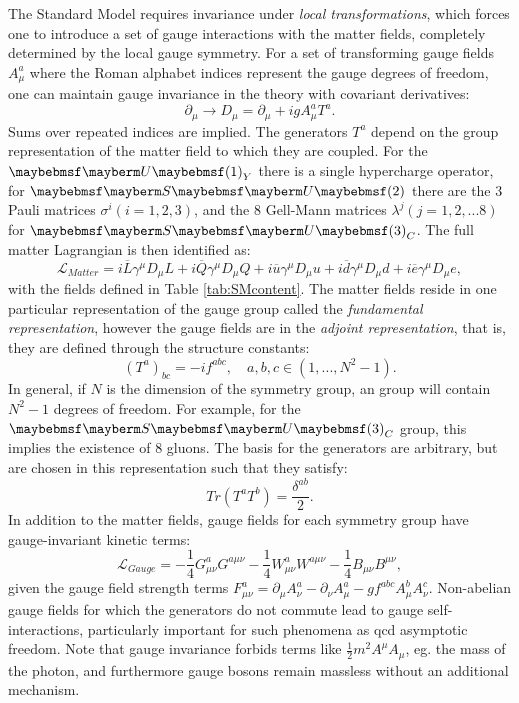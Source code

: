 The Standard Model requires invariance under \textit{local transformations}, which forces one to introduce a set of gauge interactions with the matter fields, completely determined by the local gauge symmetry.
For a set of transforming gauge fields $A^a_{\mu}$ where the Roman alphabet indices represent the gauge degrees of freedom, one can maintain gauge invariance in the theory with covariant derivatives:
\begin{equation}
\partial_{\mu}\rightarrow D_{\mu}=\partial_{\mu}+igA^{a}_{\mu}T^{a}.
\end{equation}
Sums over repeated indices are implied. The generators $T^a$ depend on the group representation of the matter field to which they are coupled. For the $\Ugroup{1}_{Y}$ there is a single hypercharge operator, for $\SUgroup{2}$ there are the 3 Pauli matrices $\sigma^{i} (i=1,2,3)$, and the 8 Gell-Mann matrices $\lambda^{j} (j=1,2,...8)$ for $\SUgroup{3}_{C}$. The full matter Lagrangian is then identified as:
\begin{equation}
\mathcal{L}_{Matter}=i\overline{L}\gamma^{\mu}D_{\mu}L+i\overline{Q}\gamma^{\mu}D_{\mu}Q+i\overline{u}\gamma^{\mu}D_{\mu}u+i\overline{d}\gamma^{\mu}D_{\mu}d+i\overline{e}\gamma^{\mu}D_{\mu}e,
\end{equation}
with the fields defined in Table \ref{tab:SMcontent}. The matter fields reside in one particular representation of the gauge group called the \textit{fundamental representation}, however the gauge fields are in the \textit{adjoint representation}, that is, they are defined through the structure constants:
\begin{equation}
(T^a)_{bc}=-if^{abc},\quad a,b,c \in (1,...,N^2-1).
\end{equation}
In general, if $N$ is the dimension of the symmetry group, an  group will contain $N^2-1$ degrees of freedom. For example, for the $\SUgroup{3}_{C}$ group, this implies the existence of 8 gluons. The basis for the generators are arbitrary, but are chosen in this representation such that they satisfy:
\begin{equation}
Tr(T^{a}T^{b})=\frac{\delta^{ab}}{2}.
\end{equation}
In addition to the matter fields, gauge fields for each symmetry group have gauge-invariant kinetic terms:
\begin{equation}
\mathcal{L}_{Gauge}=-\frac{1}{4}G^a_{\mu\nu}G^{a\mu\nu}-\frac{1}{4}W^a_{\mu\nu}W^{a\mu\nu}-\frac{1}{4}B_{\mu\nu}B^{\mu\nu},
\end{equation}
given the gauge field strength terms $F^a_{\mu\nu}=\partial_{\mu}A^a_{\nu}-\partial_{\nu}A^a_{\mu}-gf^{abc}A^b_{\mu}A^c_{\nu}$. Non-abelian gauge fields for which the generators do not commute lead to gauge self-interactions, particularly important for such phenomena as \acrshort{qcd} asymptotic freedom. Note that gauge invariance forbids terms like $\frac{1}{2}m^2 A^{\mu}A_{\mu}$, eg. the mass of the photon, and furthermore gauge bosons remain massless without an additional mechanism.

